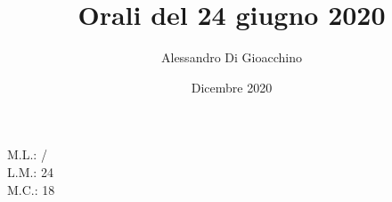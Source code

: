 \documentclass{article}
\title{Orali del 24 giugno 2020}
\author{Alessandro Di Gioacchino}
\date{Dicembre 2020}
\begin{document}
    \maketitle
    
    M.L.: / \\
    L.M.: 24 \\
    M.C.: 18 \\
    
\end{document}
